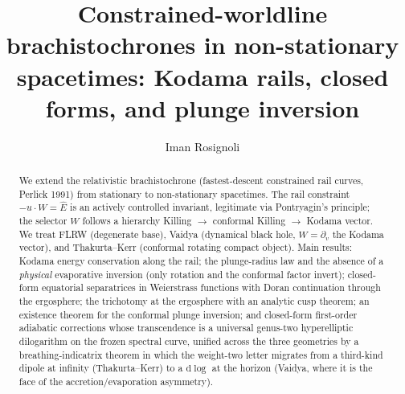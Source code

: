 \documentclass[12pt]{iopart}
\newcommand{\Ehat}{\hat E}
\begin{document}
\title{Constrained-worldline brachistochrones in non-stationary
spacetimes: Kodama rails, closed forms, and plunge inversion}

\author{Iman Rosignoli}
\address{University of Pavia, Pavia, Italy}

\begin{abstract}
We extend the relativistic brachistochrone (fastest-descent
constrained rail curves, Perlick 1991) from stationary to non-stationary
spacetimes. The rail constraint $-u\cdot W=\Ehat$ is an actively controlled
invariant, legitimate via Pontryagin's principle; the selector $W$ follows a
hierarchy Killing $\to$ conformal Killing $\to$ Kodama vector. We treat FLRW
(degenerate base), Vaidya (dynamical black hole, $W=\partial_v$ the Kodama
vector), and Thakurta--Kerr (conformal rotating compact object). Main results:
Kodama energy conservation along the rail; the plunge-radius law and the
absence of a \emph{physical} evaporative inversion (only rotation and the
conformal factor invert); closed-form equatorial separatrices in Weierstrass
functions with Doran continuation through the ergosphere; the trichotomy at
the ergosphere with an analytic cusp theorem; an existence theorem for the
conformal plunge inversion; and closed-form first-order adiabatic corrections
whose transcendence is a universal genus-two hyperelliptic dilogarithm on the
frozen spectral curve, unified across the three geometries by a
breathing-indicatrix theorem in which the weight-two letter migrates from a
third-kind dipole at infinity (Thakurta--Kerr) to a $\mathrm{d}\!\log$ at the
horizon (Vaidya, where it is the face of the accretion/evaporation asymmetry).
\end{abstract}

\maketitle

\makeatletter
\renewcommand{\numberline}[1]{#1\enspace}
\makeatother
{\hypersetup{linkcolor=black}\tableofcontents}


\end{document}
